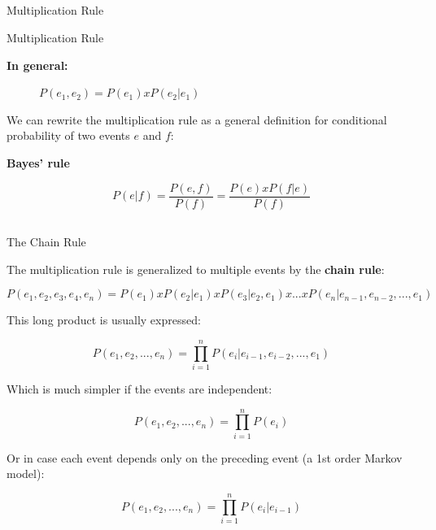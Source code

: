 \documentclass[9pt,xcolor=pdftex,dvipsnames,table]{beamer}
\begin{document}
\subsection{}
\begin{frame}{Multiplication Rule}

{\large Multiplication Rule}
\vspace{.25cm}

     \begin{description}
          \item[\textbf{In general:}] $P(e_1, e_2) = P(e_1) x P(e_2 | e_1)$
     \end{description}

\vspace{.25cm}

We can rewrite the multiplication rule as a general definition for conditional
probability of two events $e$ and $f$:
\vspace{.5cm}

{\large \textbf{Bayes' rule}}

\begin{equation*}
P(e|f) = \frac{P(e,f)}{P(f)} = \frac{P(e) x P(f|e)}{P(f)}
\end{equation*}
\end{frame}

\subsection{}
\begin{frame}{The Chain Rule}

The multiplication rule is generalized to multiple events by the \textbf{chain rule}:

\begin{equation*}
	P(e_1,e_2,e_3,e_4,e_n) = P(e_1) x P(e_2|e_1) x P(e_3|e_2,e_1) x ... x P( e_n | e_{n-1}, e_{n-2},...,e_1)
\end{equation*}

This long product is usually expressed:

\begin{equation*}
	P(e_1,e_2,...,e_n) = \prod_{i=1}^{n} P( e_i | e_{i-1}, e_{i-2},...,e_1)
\end{equation*}

Which is much simpler if the events are independent:

\begin{equation*}
	P(e_1,e_2,...,e_n) = \prod_{i=1}^{n} P( e_i )
\end{equation*}

Or in case each event depends only on the preceding event (a 1st order Markov model):

\begin{equation*}
	P(e_1,e_2,...,e_n) = \prod_{i=1}^{n} P( e_i | e_{i - 1})
\end{equation*}
\end{frame}
\end{document}
